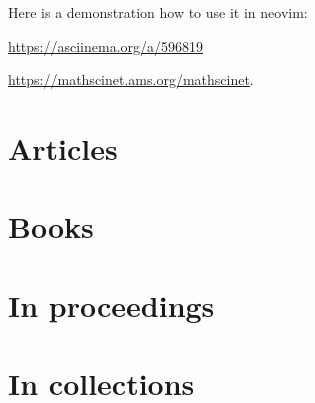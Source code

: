 \documentclass[a4paper,11pt]{article}
\begin{document}
Here is a demonstration how to use it in neovim:
\begin{center}
  \url{https://asciinema.org/a/596819}
\end{center}

\begin{center}
  \url{https://mathscinet.ams.org/mathscinet}.
\end{center}





\citeall

\section{Articles}%
\label{sec:Articles}

\printbibliography[type=article,title={Articles}]
\section{Books}%
\label{sec:Books}

\printbibliography[type=book,title={Books}]

\section{In proceedings}%
\label{sec:In proceedings}

\printbibliography[type=inproceedings,title={In proceedings}]

\section{In collections}%
\label{sec:In collections}

\printbibliography[type=incollection,title={In collection}]

\end{document}
